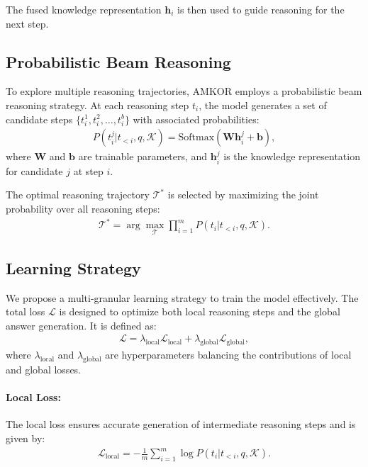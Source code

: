 The fused knowledge representation \( \mathbf{h}_i \) is then used to guide reasoning for the next step.

\subsection{Probabilistic Beam Reasoning}

To explore multiple reasoning trajectories, AMKOR employs a probabilistic beam reasoning strategy. At each reasoning step \( t_i \), the model generates a set of candidate steps \( \{t_i^1, t_i^2, \dots, t_i^b\} \) with associated probabilities:
\begin{align}
P(t_i^j | t_{<i}, q, \mathcal{K}) = \text{Softmax}(\mathbf{W} \mathbf{h}_i^j + \mathbf{b}),
\end{align}
where \( \mathbf{W} \) and \( \mathbf{b} \) are trainable parameters, and \( \mathbf{h}_i^j \) is the knowledge representation for candidate \( j \) at step \( i \).

The optimal reasoning trajectory \( \mathcal{T}^* \) is selected by maximizing the joint probability over all reasoning steps:
\begin{align}
\mathcal{T}^* = \arg\max_{\mathcal{T}} \prod_{i=1}^m P(t_i | t_{<i}, q, \mathcal{K}).
\end{align}

\subsection{Learning Strategy}

We propose a multi-granular learning strategy to train the model effectively. The total loss \( \mathcal{L} \) is designed to optimize both local reasoning steps and the global answer generation. It is defined as:
\begin{align}
\mathcal{L} = \lambda_{\text{local}} \mathcal{L}_{\text{local}} + \lambda_{\text{global}} \mathcal{L}_{\text{global}},
\end{align}
where \( \lambda_{\text{local}} \) and \( \lambda_{\text{global}} \) are hyperparameters balancing the contributions of local and global losses.

\paragraph{Local Loss:}
The local loss ensures accurate generation of intermediate reasoning steps and is given by:
\begin{align}
\mathcal{L}_{\text{local}} = -\frac{1}{m} \sum_{i=1}^m \log P(t_i | t_{<i}, q, \mathcal{K}).
\end{align}

